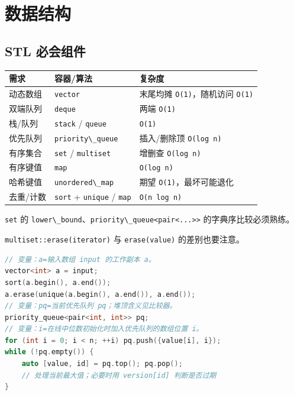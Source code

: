 \chapter{数据结构}\label{ux6570ux636eux7ed3ux6784}

\section{STL 必会组件}\label{stl-ux5fc5ux4f1aux7ec4ux4ef6}

\begin{longtable}[]{@{}lll@{}}
\toprule\noalign{}
需求 & 容器/算法 & 复杂度 \\
\midrule\noalign{}
\endhead
\bottomrule\noalign{}
\endlastfoot
动态数组 & \passthrough{\lstinline!vector!} & 末尾均摊 \passthrough{\lstinline!O(1)!}，随机访问 \passthrough{\lstinline!O(1)!} \\
双端队列 & \passthrough{\lstinline!deque!} & 两端 \passthrough{\lstinline!O(1)!} \\
栈/队列 & \passthrough{\lstinline!stack!} / \passthrough{\lstinline!queue!} & \passthrough{\lstinline!O(1)!} \\
优先队列 & \passthrough{\lstinline!priority\_queue!} & 插入/删除顶 \passthrough{\lstinline!O(log n)!} \\
有序集合 & \passthrough{\lstinline!set!} / \passthrough{\lstinline!multiset!} & 增删查 \passthrough{\lstinline!O(log n)!} \\
有序键值 & \passthrough{\lstinline!map!} & \passthrough{\lstinline!O(log n)!} \\
哈希键值 & \passthrough{\lstinline!unordered\_map!} & 期望 \passthrough{\lstinline!O(1)!}，最坏可能退化 \\
去重/计数 & \passthrough{\lstinline!sort!} + \passthrough{\lstinline!unique!} / \passthrough{\lstinline!map!} & \passthrough{\lstinline!O(n log n)!} \\
\end{longtable}

\passthrough{\lstinline!set!} 的 \passthrough{\lstinline!lower\_bound!}、\passthrough{\lstinline!priority\_queue<pair<...>>!} 的字典序比较必须熟练。

\passthrough{\lstinline!multiset::erase(iterator)!} 与 \passthrough{\lstinline!erase(value)!} 的差别也要注意。

\begin{lstlisting}[language={C++}]
// 变量：a=输入数组 input 的工作副本 a。
vector<int> a = input;
sort(a.begin(), a.end());
a.erase(unique(a.begin(), a.end()), a.end());
// 变量：pq=当前优先队列 pq；堆顶含义见比较器。
priority_queue<pair<int, int>> pq;
// 变量：i=在线中位数初始化时加入优先队列的数组位置 i。
for (int i = 0; i < n; ++i) pq.push({value[i], i});
while (!pq.empty()) {
    auto [value, id] = pq.top(); pq.pop();
    // 处理当前最大值；必要时用 version[id] 判断是否过期
}
\end{lstlisting}

